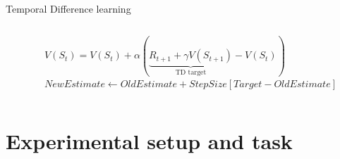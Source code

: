 \documentclass[bigger]{beamer}
\begin{document}
\begin{frame}[label={sec:org50f36c1}]{Temporal Difference learning}
\begin{columns}
\begin{column}{0.5\columnwidth}
\end{column}
\begin{column}{0.5\columnwidth}
\begin{adjustbox}{max width=\columnwidth, keepaspectratio}
$V(S_t) = V(S_t) + \alpha(\underbrace{R_{t+1} + \gamma V(S_{t+1})}_\text{TD target} - V(S_t))$
\end{adjustbox}\\[1em]
\begin{adjustbox}{max width=\columnwidth, keepaspectratio}
$NewEstimate \leftarrow OldEstimate + StepSize[Target - OldEstimate]$
\end{adjustbox}
\end{column}
\end{columns}
\end{frame}
\section{Experimental setup and task}
\label{sec:orgdced0dc}
\end{document}
